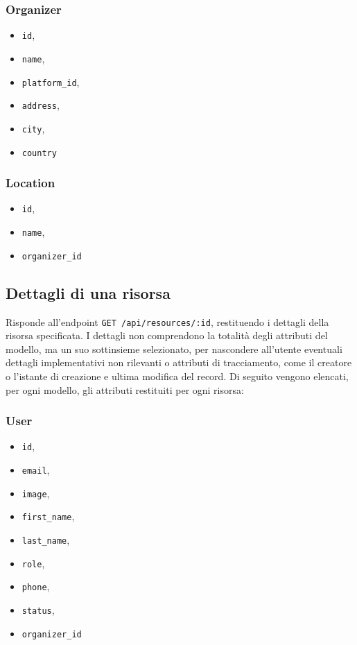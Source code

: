\subsubsection{Organizer}
\begin{itemize}
	\item \verb|id|,
	\item \verb|name|,
	\item \verb|platform_id|,
	\item \verb|address|,
	\item \verb|city|,
	\item \verb|country|
\end{itemize}

\subsubsection{Location}
\begin{itemize}
	\item \verb|id|,
	\item \verb|name|,
	\item \verb|organizer_id|
\end{itemize}

\subsection{Dettagli di una risorsa}
Risponde all'endpoint \verb|GET /api/resources/:id|, restituendo i dettagli della risorsa specificata. I dettagli non comprendono la totalità degli attributi del modello, ma un suo sottinsieme selezionato, per nascondere all'utente eventuali dettagli implementativi non rilevanti o attributi di tracciamento, come il creatore o l'istante di creazione e ultima modifica del record. Di seguito vengono elencati, per ogni modello, gli attributi restituiti per ogni risorsa:

\subsubsection{User}
\begin{itemize}
	\item \verb|id|,
	\item \verb|email|,
	\item \verb|image|,
	\item \verb|first_name|,
	\item \verb|last_name|,
	\item \verb|role|,
	\item \verb|phone|,
	\item \verb|status|,
	\item \verb|organizer_id|
\end{itemize}

